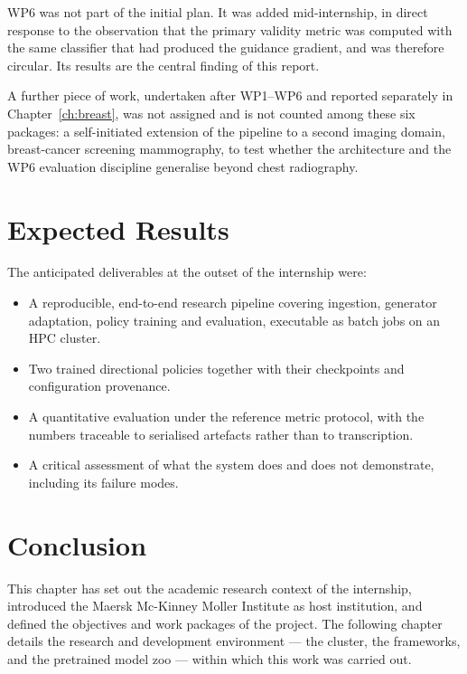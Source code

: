 WP6 was not part of the initial plan. It was added mid-internship, in
direct response to the observation that the primary validity metric was
computed with the same classifier that had produced the guidance
gradient, and was therefore circular. Its results are the central finding
of this report.

A further piece of work, undertaken after WP1--WP6 and reported separately
in Chapter~\ref{ch:breast}, was not assigned and is not counted among these
six packages: a self-initiated extension of the pipeline to a second
imaging domain, breast-cancer screening mammography, to test whether the
architecture and the WP6 evaluation discipline generalise beyond chest
radiography.

\section{Expected Results}

The anticipated deliverables at the outset of the internship were:

\begin{itemize}[leftmargin=*]
  \item A reproducible, end-to-end research pipeline covering ingestion,
        generator adaptation, policy training and evaluation, executable
        as batch jobs on an HPC cluster.
  \item Two trained directional policies together with their
        checkpoints and configuration provenance.
  \item A quantitative evaluation under the reference metric protocol,
        with the numbers traceable to serialised artefacts rather than
        to transcription.
  \item A critical assessment of what the system does and does not
        demonstrate, including its failure modes.
\end{itemize}

\section{Conclusion}

This chapter has set out the academic research context of the
internship, introduced the Maersk Mc-Kinney Moller Institute as host
institution, and defined the objectives and work packages of the
project. The following chapter details the research and development
environment --- the cluster, the frameworks, and the pretrained model
zoo --- within which this work was carried out.
